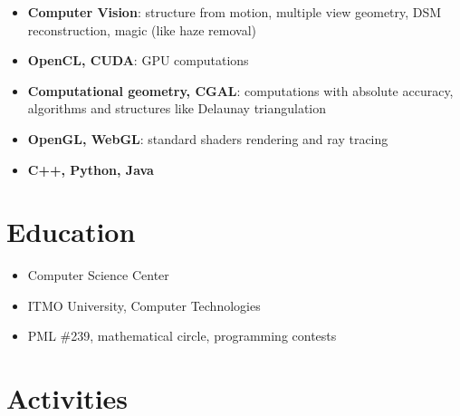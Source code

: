 \documentclass[11pt,oneside]{article}
\begin{document}
\begin{itemize}
    \item{\textbf{Computer Vision}}: structure from motion, multiple view geometry, DSM reconstruction, magic (like haze removal)

    \item{\textbf{OpenCL, CUDA}}: GPU computations
    
    \item{\textbf{Computational geometry, CGAL}}: computations with absolute accuracy, algorithms and structures like Delaunay triangulation
    
    \item{\textbf{OpenGL, WebGL}}: standard shaders rendering and ray tracing
    
    \item{\textbf{C++, Python, Java}}
\end{itemize}


\vspace{-9pt}
\section*{\textbf{Education}}
\vspace{-9pt}

\begin{itemize}
    \item{Computer Science Center}
    \item{ITMO University, Computer Technologies}
    \item{PML \#239, mathematical circle, programming contests}
\end{itemize}


\vspace{-9pt}
\section*{\textbf{Activities}}
\vspace{-9pt}
\end{document}
